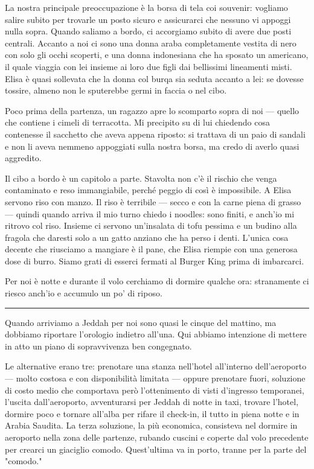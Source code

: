 La nostra principale preoccupazione è la borsa di tela coi souvenir: vogliamo salire subito per trovarle un posto sicuro e assicurarci che nessuno vi appoggi nulla sopra. Quando saliamo a bordo, ci accorgiamo subito di avere due posti centrali. Accanto a noi ci sono una donna araba completamente vestita di nero con solo gli occhi scoperti, e una donna indonesiana che ha sposato un americano, il quale viaggia con lei insieme ai loro due figli dai bellissimi lineamenti misti. Elisa è quasi sollevata che la donna col burqa sia seduta accanto a lei: se dovesse tossire, almeno non le sputerebbe germi in faccia o nel cibo.

Poco prima della partenza, un ragazzo apre lo scomparto sopra di noi — quello che contiene i cimeli di terracotta. Mi precipito su di lui chiedendo cosa contenesse il sacchetto che aveva appena riposto: si trattava di un paio di sandali e non li aveva nemmeno appoggiati sulla nostra borsa, ma credo di averlo quasi aggredito.

Il cibo a bordo è un capitolo a parte. Stavolta non c'è il rischio che venga contaminato e reso immangiabile, perché peggio di così è impossibile. A Elisa servono riso con manzo. Il riso è terribile — secco e con la carne piena di grasso — quindi quando arriva il mio turno chiedo i noodles: sono finiti, e anch'io mi ritrovo col riso. Insieme ci servono un'insalata di tofu pessima e un budino alla fragola che daresti solo a un gatto anziano che ha perso i denti. L'unica cosa decente che riusciamo a mangiare è il pane, che Elisa riempie con una generosa dose di burro. Siamo grati di esserci fermati al Burger King prima di imbarcarci.

Per noi è notte e durante il volo cerchiamo di dormire qualche ora: stranamente ci riesco anch'io e accumulo un po' di riposo.

\begin{center}
    \noindent\rule{0.6\textwidth}{0.4pt}
\end{center}

Quando arriviamo a Jeddah per noi sono quasi le cinque del mattino, ma dobbiamo riportare l'orologio indietro all'una. Qui abbiamo intenzione di mettere in atto un piano di sopravvivenza ben congegnato.

Le alternative erano tre: prenotare una stanza nell'hotel all'interno dell'aeroporto — molto costosa e con disponibilità limitata — oppure prenotare fuori, soluzione di costo medio che comportava però l'ottenimento di visti d'ingresso temporanei, l'uscita dall'aeroporto, avventurarsi per Jeddah di notte in taxi, trovare l'hotel, dormire poco e tornare all'alba per rifare il check-in, il tutto in piena notte e in Arabia Saudita. La terza soluzione, la più economica, consisteva nel dormire in aeroporto nella zona delle partenze, rubando cuscini e coperte dal volo precedente per crearci un giaciglio comodo. Quest'ultima va in porto, tranne per la parte del "comodo."

